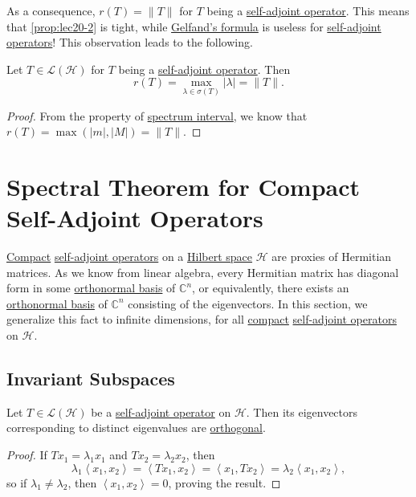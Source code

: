 As a consequence, \(r(T) = \lVert T \rVert \) for \(T\) being a \hyperref[def:self-adjoint-op]{self-adjoint operator}. This means that \autoref{prop:lec20-2} is tight, while \hyperref[thm:Gelfand-formula]{Gelfand's formula} is useless for \hyperref[def:self-adjoint-op]{self-adjoint operators}! This observation leads to the following.

\begin{corollary}\label{col:spectral-radius}
	Let \(T\in \mathcal{L} (\mathcal{H} )\) for \(T\) being a \hyperref[def:self-adjoint-op]{self-adjoint operator}. Then
	\[
		r(T) = \max _{\lambda \in \sigma (T)} \vert \lambda \vert = \lVert T \rVert.
	\]
\end{corollary}
\begin{proof}
	From the property of \hyperref[thm:spectrum-interval]{spectrum interval}, we know that \(r(T) = \max (\vert m \vert , \vert M \vert ) = \lVert T \rVert\).
\end{proof}

\section{Spectral Theorem for Compact Self-Adjoint Operators}
\hyperref[def:compact-op]{Compact} \hyperref[def:self-adjoint-op]{self-adjoint operators} on a \hyperref[def:Hilbert-space]{Hilbert space} \(\mathcal{H} \) are proxies of Hermitian matrices. As we know from linear algebra, every Hermitian matrix has diagonal form in some \hyperref[def:orthonormal-basis]{orthonormal basis} of \(\mathbb{C} ^n\), or equivalently, there exists an \hyperref[def:orthonormal-basis]{orthonormal basis} of \(\mathbb{C} ^n\) consisting of the eigenvectors. In this section, we generalize this fact to infinite dimensions, for all \hyperref[def:compact-op]{compact} \hyperref[def:self-adjoint-op]{self-adjoint operators} on \(\mathcal{H} \).

\subsection{Invariant Subspaces}
\begin{proposition}\label{prop:eigenvectors-orthogonal}
	Let \(T\in \mathcal{L} (\mathcal{H} )\) be a \hyperref[def:self-adjoint-op]{self-adjoint operator} on \(\mathcal{H} \). Then its eigenvectors corresponding to distinct eigenvalues are \hyperref[def:orthogonal-system]{orthogonal}.
\end{proposition}
\begin{proof}
	If \(Tx_1 = \lambda _1 x_1\) and \(Tx_2 = \lambda _2 x_2\), then
	\[
		\lambda _1 \left\langle x_1, x_2 \right\rangle
		= \left\langle Tx_1, x_2 \right\rangle
		= \left\langle x_1, Tx_2 \right\rangle
		= \lambda _2 \left\langle x_1, x_2 \right\rangle,
	\]
	so if \(\lambda _1 \neq \lambda _2\), then \(\left\langle x_1, x_2 \right\rangle = 0\), proving the result.
\end{proof}

